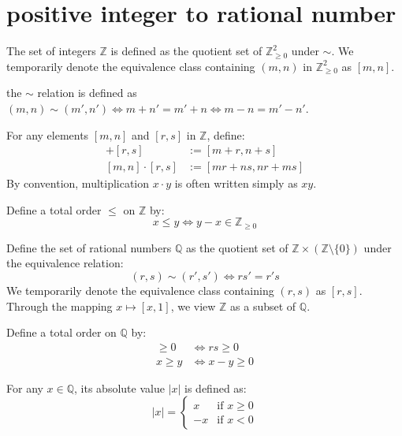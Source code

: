\documentclass[11pt,lang=en]{elegantbook}
\begin{document}
\section{positive integer to rational number }

\begin{definition}
  The set of integers $\mathbb{Z}$ is defined as the quotient set of $\mathbb{Z}_{\geq 0}^2$ under $\sim$. We temporarily denote the equivalence class containing $(m,n)$ in $\mathbb{Z}_{\geq 0}^2$ as $[m,n]$.
\end{definition}

\begin{remark}
  the $\sim$ relation is defined as $(m,n)\sim(m',n')\iff m+n'=m'+n \iff m-n=m'-n'$.
\end{remark}


\begin{definition}
  For any elements $[m,n]$ and $[r,s]$ in $\mathbb{Z}$, define:
  \begin{align*}
    [m,n] + [r,s] &:= [m+r, n+s] \\
    [m,n] \cdot [r,s] &:= [mr+ns, nr+ms]
  \end{align*}
  By convention, multiplication $x \cdot y$ is often written simply as $xy$.
\end{definition}

\begin{definition}
  Define a total order $\leq$ on $\mathbb{Z}$ by:
  \[
    x \leq y \iff y-x \in \mathbb{Z}_{\geq 0}
  \]
\end{definition}


\begin{definition}
  Define the set of rational numbers $\mathbb{Q}$ as the quotient set of $\mathbb{Z} \times (\mathbb{Z} \setminus \{0\})$ under the equivalence relation:
  \[
    (r,s) \sim (r',s') \iff rs' = r's
  \]
  We temporarily denote the equivalence class containing $(r,s)$ as $[r,s]$. Through the mapping $x \mapsto [x,1]$, we view $\mathbb{Z}$ as a subset of $\mathbb{Q}$.
\end{definition}

\begin{definition}
  Define a total order on $\mathbb{Q}$ by:
  \begin{align*}
    [r,s] \geq 0 &\iff rs \geq 0 \\
    x \geq y &\iff x-y \geq 0
  \end{align*}
  
  For any $x \in \mathbb{Q}$, its absolute value $|x|$ is defined as:
  \[
    |x| = \begin{cases}
      x & \text{if } x \geq 0 \\
      -x & \text{if } x < 0
    \end{cases}
  \]
\end{definition}
\end{document}
